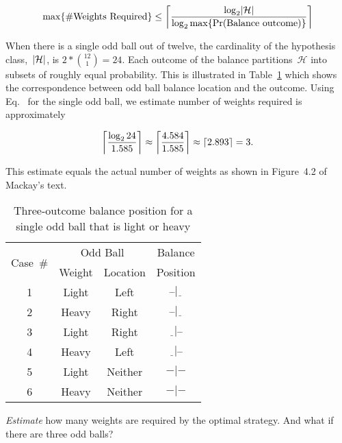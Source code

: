   \begin{equation}\label{eq:worstCaseWeighingsCount}
    \max \{\#\text{Weights Required}\} \leq \ceil*{\frac{\log_{2} \abs{\mathcal{H}}}{\log_{2} \max \{\Pr(\text{Balance outcome})\} }}
  \end{equation}



  When there is a single odd ball out of twelve, the cardinality of the hypothesis class,~$\abs{\mathcal{H}}$, is ${2 * \binom{12}{1} = 24}$. Each outcome of the balance partitions~$\mathcal{H}$ into subsets of roughly equal probability. This is illustrated in Table~\ref{tab:p1OneBallTable} which shows the correspondence between odd ball balance location and the outcome. Using Eq.~ for the single odd ball, we estimate number of weights required is approximately

  \[ \ceil*{\frac{\log_{2}24}{1.585}} \approx \ceil*{\frac{4.584}{1.585}} \approx \ceil{2.893} = 3 \text{.} \]

  \noindent
  This estimate equals the actual number of weights as shown in Figure~4.2 of Mackay's text.

  \begin{table}[H]
    \centering
    \caption{Three-outcome balance position for a \\single odd ball that is light or heavy}\label{tab:p1OneBallTable}
    \begin{tabular}{|c||c|c||c|}
      \hline
      \multirow{2}{*}{Case~\#} &  \multicolumn{2}{c||}{Odd Ball} & Balance\\\cline{2-3}
      &  Weight  &  Location &  Position  \\ \hline\hline
      1   &  Light   &  Left     &  $\bar{~}\bar{~}|\underline{~~}$ \\ \hline
      2   &  Heavy   &  Right    &  $\bar{~}\bar{~}|\underline{~~}$ \\ \hline\hline
      3   &  Light   &  Right    &  $\underline{~~}|\bar{~}\bar{~}$ \\ \hline
      4   &  Heavy   &  Left     &  $\underline{~~}|\bar{~}\bar{~}$ \\ \hline\hline
      5   &  Light   &  Neither  &  $-|-$ \\ \hline
      6   &  Heavy   &  Neither  &  $-|-$ \\ \hline
    \end{tabular}
  \end{table}


\begin{subproblem}
  \textit{Estimate} how many weights are required by the optimal strategy.  And what if there are three odd balls?
\end{subproblem}

